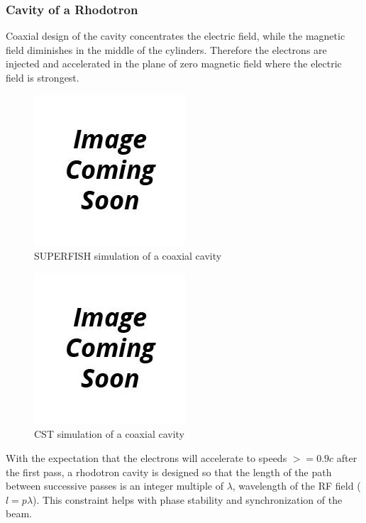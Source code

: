 \documentclass[a4paper,oneside,12pt]{report}
\numberwithin{equation}{chapter}
\begin{document}
\subsubsection{Cavity of a Rhodotron} \label{sec:cavity_of_a_rhodotron}

Coaxial design of the cavity concentrates the electric field, while the magnetic field diminishes in the middle of the cylinders. 
Therefore the electrons are injected and accelerated in the plane of zero magnetic field where the electric field is strongest.

\begin{figure}[H]
    \centering
    \includegraphics[scale=0.75]{./figures/to_be_added.png}
    \caption{SUPERFISH simulation of a coaxial cavity}
\end{figure}

\begin{figure}[H]
    \centering
    \includegraphics[scale=0.75]{./figures/to_be_added.png}
    \caption{CST simulation of a coaxial cavity}
\end{figure}

With the expectation that the electrons will accelerate to speeds $>=0.9 c$ after the first pass, a rhodotron cavity is designed so that the length of the path between successive passes is an integer multiple of $\lambda$, wavelength of the RF field ($l=p\lambda \label{eq:lpl}$).
This constraint helps with  phase stability and synchronization of the beam.
\end{document}
